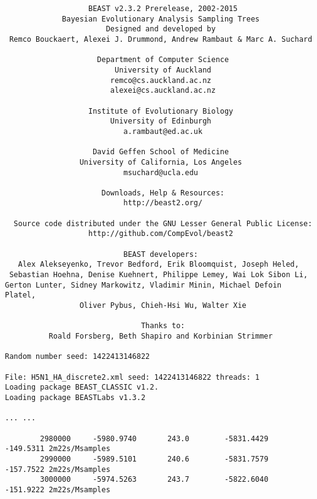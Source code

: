 \documentclass{article}
\begin{document}
{\tiny   
\begin{verbatim}
                   BEAST v2.3.2 Prerelease, 2002-2015
             Bayesian Evolutionary Analysis Sampling Trees
                       Designed and developed by
 Remco Bouckaert, Alexei J. Drummond, Andrew Rambaut & Marc A. Suchard
                                    
                     Department of Computer Science
                         University of Auckland
                        remco@cs.auckland.ac.nz
                        alexei@cs.auckland.ac.nz
                                    
                   Institute of Evolutionary Biology
                        University of Edinburgh
                           a.rambaut@ed.ac.uk
                                    
                    David Geffen School of Medicine
                 University of California, Los Angeles
                           msuchard@ucla.edu
                                    
                      Downloads, Help & Resources:
                           http://beast2.org/
                                    
  Source code distributed under the GNU Lesser General Public License:
                   http://github.com/CompEvol/beast2
                                    
                           BEAST developers:
   Alex Alekseyenko, Trevor Bedford, Erik Bloomquist, Joseph Heled, 
 Sebastian Hoehna, Denise Kuehnert, Philippe Lemey, Wai Lok Sibon Li, 
Gerton Lunter, Sidney Markowitz, Vladimir Minin, Michael Defoin Platel, 
                 Oliver Pybus, Chieh-Hsi Wu, Walter Xie
                                    
                               Thanks to:
          Roald Forsberg, Beth Shapiro and Korbinian Strimmer

Random number seed: 1422413146822

File: H5N1_HA_discrete2.xml seed: 1422413146822 threads: 1
Loading package BEAST_CLASSIC v1.2.
Loading package BEASTLabs v1.3.2

... ...

        2980000     -5980.9740       243.0        -5831.4429      -149.5311 2m22s/Msamples
        2990000     -5989.5101       240.6        -5831.7579      -157.7522 2m22s/Msamples
        3000000     -5974.5263       243.7        -5822.6040      -151.9222 2m22s/Msamples


\end{verbatim}}
\end{document}
